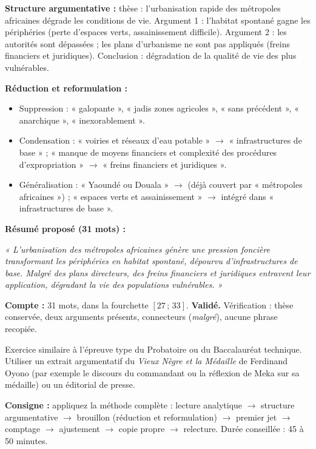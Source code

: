\documentclass[11pt]{article}
\begin{document}
\begin{corrige}
\textbf{Structure argumentative :} thèse : l'urbanisation rapide des métropoles africaines dégrade les conditions de vie. Argument 1 : l'habitat spontané gagne les périphéries (perte d'espaces verts, assainissement difficile). Argument 2 : les autorités sont dépassées ; les plans d'urbanisme ne sont pas appliqués (freins financiers et juridiques). Conclusion : dégradation de la qualité de vie des plus vulnérables.
\par \textbf{Réduction et reformulation :}
\begin{itemize}
    \item Suppression : « galopante », « jadis zones agricoles », « sans précédent », « anarchique », « inexorablement ».
    \item Condensation : « voiries et réseaux d'eau potable » $\to$ « infrastructures de base » ; « manque de moyens financiers et complexité des procédures d'expropriation » $\to$ « freins financiers et juridiques ».
    \item Généralisation : « Yaoundé ou Douala » $\to$ (déjà couvert par « métropoles africaines ») ; « espaces verts et assainissement » $\to$ intégré dans « infrastructures de base ».
\end{itemize}
\textbf{Résumé proposé (31 mots) :}
\par \textit{« L'urbanisation des métropoles africaines génère une pression foncière transformant les périphéries en habitat spontané, dépourvu d'infrastructures de base. Malgré des plans directeurs, des freins financiers et juridiques entravent leur application, dégradant la vie des populations vulnérables. »}
\par \textbf{Compte :} 31 mots, dans la fourchette $[27\,;\,33]$. \textbf{Validé.} Vérification : thèse conservée, deux arguments présents, connecteurs (\emph{malgré}), aucune phrase recopiée.
\end{corrige}

\begin{exercice}
Exercice similaire à l'épreuve type du Probatoire ou du Baccalauréat technique. Utiliser un extrait argumentatif du \emph{Vieux Nègre et la Médaille} de Ferdinand Oyono (par exemple le discours du commandant ou la réflexion de Meka sur sa médaille) ou un éditorial de presse.
\par \textbf{Consigne :} appliquez la méthode complète : lecture analytique $\to$ structure argumentative $\to$ brouillon (réduction et reformulation) $\to$ premier jet $\to$ comptage $\to$ ajustement $\to$ copie propre $\to$ relecture. Durée conseillée : 45 à 50 minutes.
\end{exercice}
\end{document}
